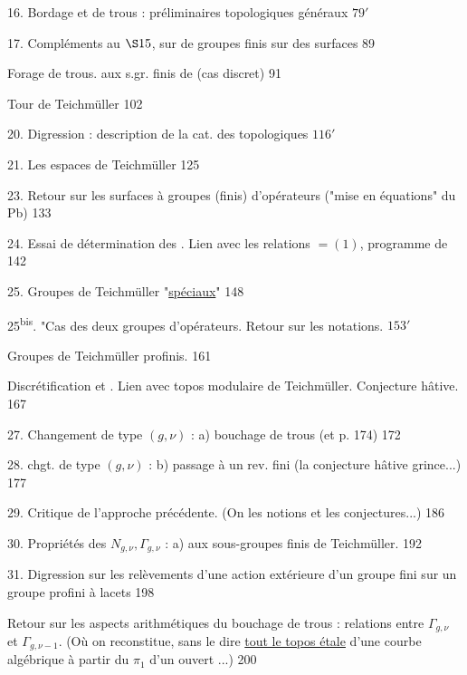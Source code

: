 16. Bordage et  de trous : préliminaires topologiques généraux
\hfill \(79'\)

17. Compléments au \(\S 15\), sur  de groupes finis
sur des surfaces \hfill 89

 Forage de trous.  aux s.gr.
finis de 
(cas discret) \hfill 91

 Tour de Teichmüller \hfill 102

20. Digression : description 
de la cat. des  topologiques \hfill \(116'\)

21. Les espaces de Teichmüller \hfill 125


23. Retour sur les surfaces à groupes (finis) d'opérateurs
("mise en équations" du Pb) \hfill 133

24. Essai de détermination des . Lien avec les relations
 \(=(1)\),
programme de  \hfill 142

25. Groupes de Teichmüller "\uline{spéciaux}" \hfill 148

25\textsuperscript{bis}. "Cas des deux groupes d'opérateurs. Retour sur les notations.
\hfill \(153'\)

 Groupes de Teichmüller profinis. \hfill 161

Discrétification et . Lien avec topos
modulaire de Teichmüller. Conjecture hâtive. \hfill 167

27. Changement de type \((g,\nu)\) : a) bouchage de trous
(et  p. 174) \hfill 172

28. chgt. de type \((g,\nu)\) : b) passage à un rev. fini
(la conjecture hâtive grince...) \hfill 177

29. Critique de l'approche précédente. (On 
les notions et les conjectures...) \hfill 186

30. Propriétés des \(N_{g,\nu},\Gamma_{g,\nu}\) : a)
 aux sous-groupes finis de Teichmüller.
\hfill 192

31. Digression sur les relèvements d'une action extérieure d'un groupe
fini sur un groupe profini à lacets \hfill 198

 Retour sur les aspects arithmétiques du bouchage de trous :
relations entre \(\Gamma_{g,\nu}\) et \(\Gamma_{g,\nu-1}\).
(Où on reconstitue, sans le dire \uline{tout le topos étale} d'une
courbe algébrique  à partir du \(\pi_1\) d'un
ouvert ...) \hfill 200

